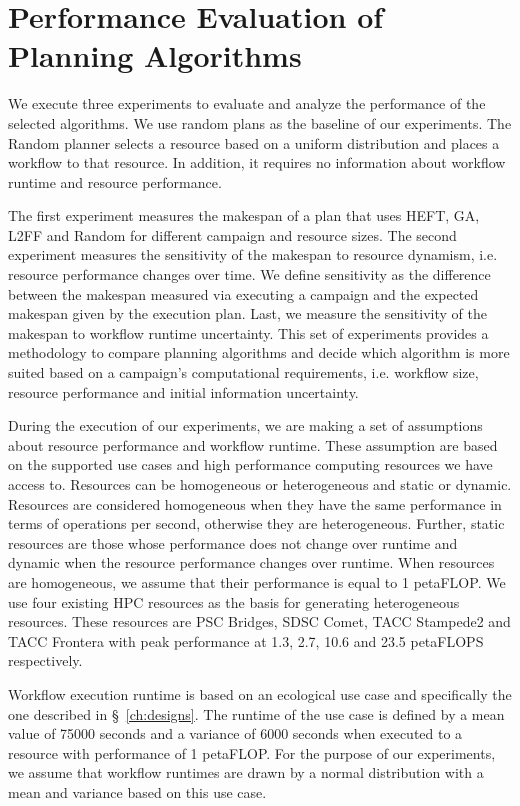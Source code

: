 \section{Performance Evaluation of Planning Algorithms}
\label{sec:algo_perf_comp}

We execute three experiments to evaluate and analyze the performance of the selected algorithms.
We use random plans as the baseline of our experiments.
The Random planner selects a resource based on a uniform distribution and places a workflow to that resource.
In addition, it requires no information about workflow runtime and resource performance.

The first experiment measures the makespan of a plan that uses HEFT, GA, L2FF and Random for different campaign and resource sizes.
The second experiment measures the sensitivity of the makespan to resource dynamism, i.e. resource performance changes over time.
We define sensitivity as the difference between the makespan measured via executing a campaign and the expected makespan given by the execution plan.
Last, we measure the sensitivity of the makespan to workflow runtime uncertainty.
This set of experiments provides a methodology to compare planning algorithms and decide which algorithm is more suited based on a campaign's computational requirements, i.e. workflow size, resource performance and initial information uncertainty.

During the execution of our experiments, we are making a set of assumptions about resource performance and workflow runtime.
These assumption are based on the supported use cases and high performance computing resources we have access to.
Resources can be homogeneous or heterogeneous and static or dynamic.
Resources are considered homogeneous when they have the same performance in terms of operations per second, otherwise they are heterogeneous.
Further, static resources are those whose performance does not change over runtime and dynamic when the resource performance changes over runtime.
When resources are homogeneous, we assume that their performance is equal to 1 petaFLOP.
We use four existing HPC resources as the basis for generating heterogeneous resources.
These resources are PSC Bridges, SDSC Comet, TACC Stampede2 and TACC Frontera with peak performance at 1.3, 2.7, 10.6 and 23.5 petaFLOPS respectively.

Workflow execution runtime is based on an ecological use case and specifically the one described in \S~\ref{ch:designs}.
The runtime of the use case is defined by a mean value of 75000 seconds and a variance of 6000 seconds when executed to a resource with performance of 1 petaFLOP.
For the purpose of our experiments, we assume that workflow runtimes are drawn by a normal distribution with a mean and variance based on this use case.

